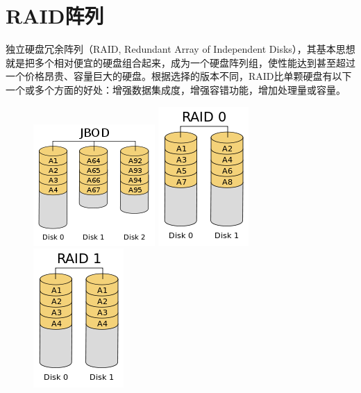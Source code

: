 \section{RAID阵列}

独立硬盘冗余阵列（RAID, Redundant Array of Independent Disks），其基本思想就是把多个相对便宜的硬盘组合起来，成为一个硬盘阵列组，使性能达到甚至超过一个价格昂贵、容量巨大的硬盘。根据选择的版本不同，RAID比单颗硬盘有以下一个或多个方面的好处：增强数据集成度，增强容错功能，增加处理量或容量。

\begin{figure}[ht]
	\begin{center}
		\includegraphics[keepaspectratio,width=0.15\paperwidth]{Pictures/RAID/JBOD.png}
		\includegraphics[keepaspectratio,width=0.1\paperwidth]{Pictures/RAID/RAID0.png}
		\includegraphics[keepaspectratio,width=0.1\paperwidth]{Pictures/RAID/RAID1.png}
	\end{center}
\end{figure}

